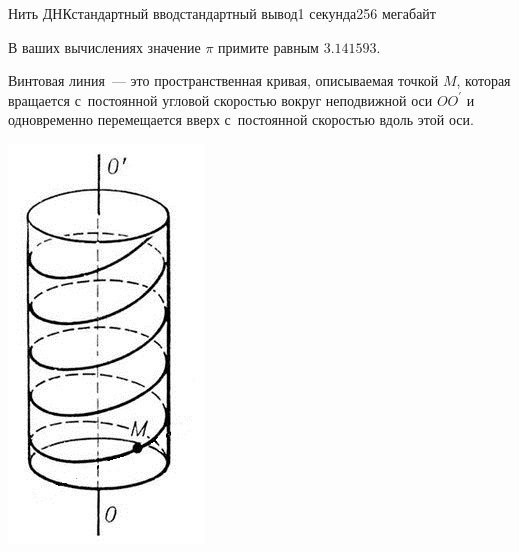 \begin{problem}{Нить ДНК}{стандартный ввод}{стандартный вывод}{1 секунда}{256 мегабайт}
\Example

\begin{example}
%
\end{example}

\Note
В ваших вычислениях значение $\pi$ примите равным $3.141593$.

Винтовая линия~--- это пространственная кривая, описываемая точкой $M$, которая вращается с~постоянной угловой скоростью вокруг неподвижной оси $OO^\prime$ и одновременно перемещается вверх с~постоянной скоростью вдоль этой оси.
\begin{center}
\includegraphics[scale=0.4]{291913915.jpg}
\end{center}

\end{problem}

